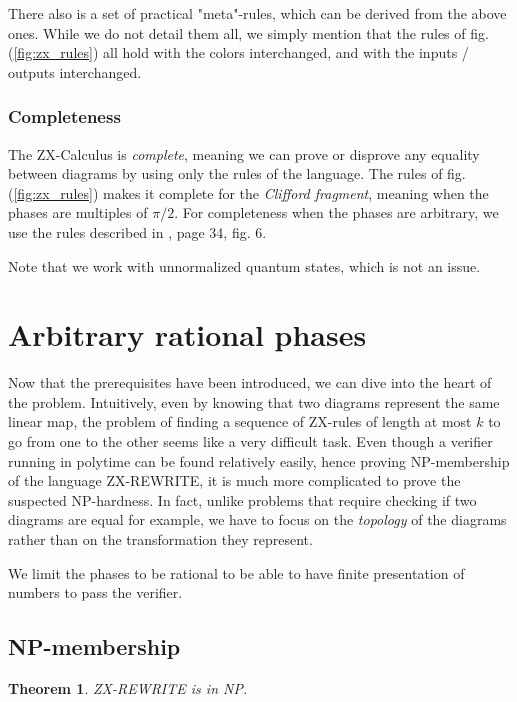 \documentclass[journal,onecolumn]{IEEEtran}
\newtheorem{theorem}{Theorem}
\begin{document}
There also is a set of practical "meta"-rules, which can be derived from the above ones. While we do not detail them all, we simply mention that the rules of fig. (\ref{fig:zx_rules}) all hold with the colors interchanged, and with the inputs / outputs interchanged.\\

\subsubsection{Completeness} The ZX-Calculus is \textit{complete}, meaning we can prove or disprove any equality between diagrams by using only the rules of the language. The rules of fig. (\ref{fig:zx_rules}) makes it complete for the \textit{Clifford fragment}, meaning when the phases are multiples of $\pi / 2$. For completeness when the phases are arbitrary, we use the rules described in \cite{ZXcompleteness}, page 34, fig. 6.

Note that we work with unnormalized quantum states, which is not an issue.


\section{Arbitrary rational phases}

Now that the prerequisites have been introduced, we can dive into the heart of the problem. Intuitively, even by knowing that two diagrams represent the same linear map, the problem of finding a sequence of ZX-rules of length at most $k$ to go from one to the other seems like a very difficult task. Even though a verifier running in polytime can be found relatively easily, hence proving \textsc{NP}-membership of the language \textsc{ZX-REWRITE}, it is much more complicated to prove the suspected NP-hardness. In fact, unlike problems that require checking if two diagrams are equal for example, we have to focus on the \textit{topology} of the diagrams rather than on the transformation they represent.

We limit the phases to be rational to be able to have finite presentation of numbers to pass the verifier.

\subsection{\textsc{NP}-membership}

\begin{theorem}{}{}
	\textsc{ZX-REWRITE} is in \textsc{NP}.	
\end{theorem}
\end{document}
